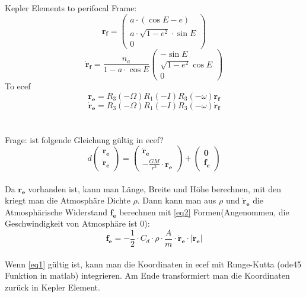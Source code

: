 \documentclass{article}
\begin{document}
\section{}
Kepler Elements to perifocal Frame: 
\begin{equation*}
	\bm{r_f} = \left(\begin{matrix}
		a \cdot \left(\cos E-e\right) \\
		a \cdot \sqrt{1-e^2} \cdot \sin E \\
		0
	\end{matrix}\right)
\end{equation*}
\begin{equation*}
	\bm{\dot{r}_f} = \frac{n_a}{1-a \cdot \cos E}\left(\begin{matrix}
		-\sin E \\
		\sqrt{1-e^2} \cos E \\
		0
	\end{matrix}\right)
\end{equation*}
To ecef
\begin{equation*}
	\bm{r_e} = R_3(-\Omega) R_1(-I) R_3(-\omega) \bm{r_f}
\end{equation*}
\begin{equation*}
	\bm{\dot{r}_e} = R_3(-\Omega) R_1(-I) R_3(-\omega) \bm{\dot{r}_f}
\end{equation*}
\\
\\
Frage: ist folgende Gleichung gültig in ecef?
\begin{equation}\label{eq1}
	d \left(\begin{matrix}
		\bm{r_e} \\
		\bm{\dot{r}_e}
	\end{matrix}\right) = \left(\begin{matrix}
	\bm{\dot{r}_e} \\
	-\frac{GM}{r^3} \cdot \bm{r_e}
\end{matrix}\right) + \left(\begin{matrix}
\bm{0} \\
\bm{f_e}
\end{matrix}\right)
\end{equation}
\\
Da $\bm{r_e}$ vorhanden ist, kann man Länge, Breite und Höhe berechnen, mit den kriegt man die Atmosphäre Dichte $\rho$. Dann kann man aus $\rho$ und $\bm{\dot{r}_e}$ die Atmosphärische Widerstand $\bm{f_e}$ berechnen mit \autoref{eq2} Formen(Angenommen, die Geschwindigkeit von Atmosphäre ist 0):
\begin{equation}\label{eq2}
	\bm{f_e} = -\frac{1}{2} \cdot C_d \cdot \rho \cdot \frac{A}{m} \cdot \bm{\dot{r}_e} \cdot |\bm{\dot{r}_e}|
\end{equation}
\\
Wenn \autoref{eq1} gültig ist, kann man die Koordinaten in ecef mit Runge-Kutta (ode45 Funktion in matlab) integrieren. Am Ende transformiert man die Koordinaten zurück in Kepler Element.
\end{document}
